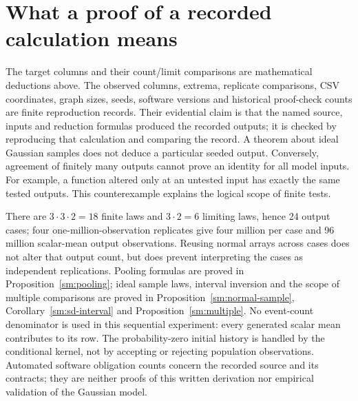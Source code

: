\section{What a proof of a recorded calculation means}
\label{seqp:record-scope}
The target columns and their count/limit comparisons are mathematical
deductions above. The observed columns, extrema, replicate comparisons,
CSV coordinates, graph sizes, seeds, software versions and historical
proof-check counts are finite reproduction records. Their evidential
claim is that the named source, inputs and reduction formulas produced
the recorded outputs; it is checked by reproducing that calculation and
comparing the record. A theorem about ideal Gaussian samples does not
deduce a particular seeded output. Conversely, agreement of finitely many
outputs cannot prove an identity for all model inputs. For example, a
function altered only at an untested input has exactly the same tested
outputs. This counterexample explains the logical scope of finite tests.

There are \(3\cdot3\cdot2=18\) finite laws and \(3\cdot2=6\)
limiting laws, hence 24 output cases; four one-million-observation
replicates give four million per case and 96 million scalar-mean output
observations. Reusing normal arrays across cases does not alter that
output count, but does prevent interpreting the cases as independent
replications. Pooling formulas are proved in
Proposition~\ref{sm:pooling}; ideal sample laws, interval inversion and
the scope of multiple comparisons are proved in
Proposition~\ref{sm:normal-sample}, Corollary~\ref{sm:sd-interval} and
Proposition~\ref{sm:multiple}. No event-count denominator is used in this sequential
experiment: every generated scalar mean contributes to its row. The
probability-zero initial history is handled by the conditional kernel,
not by accepting or rejecting population observations. Automated software
obligation counts concern the recorded source and its contracts; they
are neither proofs of this written derivation nor empirical validation of
the Gaussian model.
